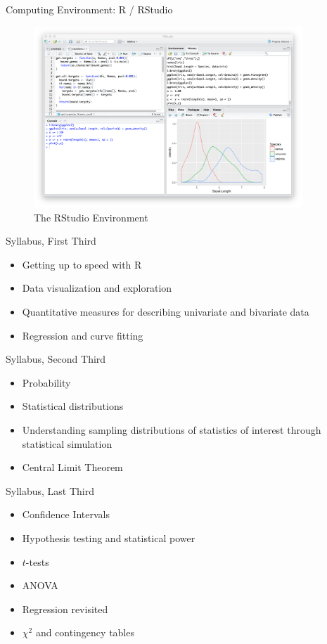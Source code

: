 \documentclass[presentation]{beamer}
\begin{document}
\begin{frame}[label={sec:orgheadline4}]{Computing Environment: R / RStudio}
\begin{figure}[htb]
\centering
\includegraphics[width=0.9\textwidth]{./rstudio-screen.png}
\caption{The RStudio Environment}
\end{figure}
\end{frame}

\begin{frame}[label={sec:orgheadline5}]{Syllabus, First Third}
\begin{itemize}
\item Getting up to speed with R
\item Data visualization and exploration
\item Quantitative measures for describing univariate and bivariate data
\item Regression and curve fitting
\end{itemize}
\end{frame}

\begin{frame}[label={sec:orgheadline6}]{Syllabus, Second Third}
\begin{itemize}
\item Probability
\item Statistical distributions
\item Understanding sampling distributions of statistics of interest through statistical simulation
\item Central Limit Theorem
\end{itemize}
\end{frame}

\begin{frame}[label={sec:orgheadline7}]{Syllabus, Last Third}
\begin{itemize}
\item Confidence Intervals
\item Hypothesis testing and statistical power
\item \(t\)-tests
\item ANOVA
\item Regression revisited
\item \(\chi^2\) and contingency tables
\end{itemize}
\end{frame}
\end{document}
